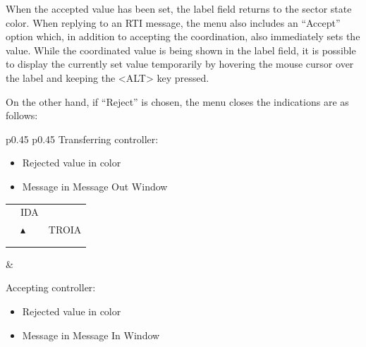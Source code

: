 \documentclass[a4paper,oneside,11pt]{memoir}
\begin{document}
\bigskip

When the accepted value has been set, the label field returns to the sector state color. When replying to an RTI message, the menu also includes an “Accept” option which, in addition to accepting the coordination, also immediately sets the value. While the coordinated value is being shown in the label field, it is possible to display the currently set value temporarily by hovering the mouse cursor over the label and keeping the <ALT> key pressed.

\bigskip

On the other hand, if “Reject” is chosen, the menu closes the indications are as follows:

\bigskip

\begin{longtable}{p{} p{}}
  Transferring controller:

  \begin{itemize}
    \item Rejected value in  color
    \item Message in Message Out Window
  \end{itemize}
  
  \begin{tabular}{
    >{\columncolor{Flight Highlight}}l 
    >{\columncolor{Flight Highlight}}l
    >{\columncolor{Flight Highlight}}l }
    {\color{Assumed} ABC123} & {\color{Coordination} IDA}       & {\color{Assumed} }      \\
    {\color{Assumed} 100}    & {\color{Assumed} $\blacktriangle$} & {\color{Assumed} TROIA} \\
    {\color{Assumed} 180}    & {\color{Assumed} }          & {\color{Assumed} }\\  
    {\color{Warning} H360} & {\color{Assumed} }       & {\color{Assumed} }      \\       
  \end{tabular}

  &

  Accepting controller:

  \begin{itemize}
    \item Rejected value in  color
    \item Message in Message In Window
  \end{itemize}
  

\end{longtable}
\end{document}
